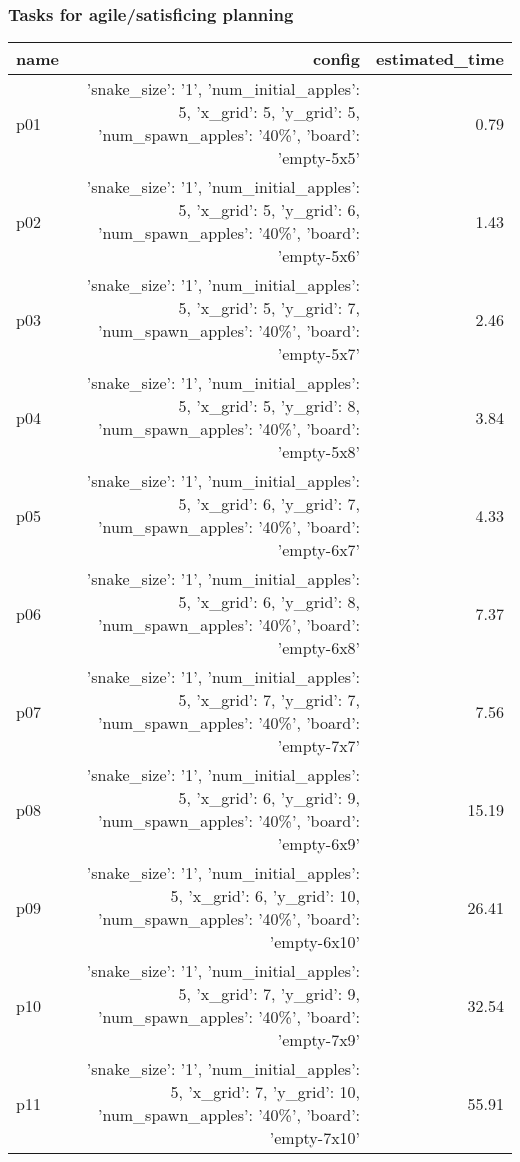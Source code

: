 \documentclass{article}
\begin{document}
                                \subsubsection*{Tasks for agile/satisficing planning}
                                
                            \begin{center}
                            \scriptsize
                            \begin{tabular}{@{}l|r|r@{}}
                            name & config & estimated\_time\\\midrule
                              p01&{'snake\_size': '1', 'num\_initial\_apples': 5, 'x\_grid': 5, 'y\_grid': 5, 'num\_spawn\_apples': '40\%', 'board': 'empty-5x5'}&0.79\\
  p02&{'snake\_size': '1', 'num\_initial\_apples': 5, 'x\_grid': 5, 'y\_grid': 6, 'num\_spawn\_apples': '40\%', 'board': 'empty-5x6'}&1.43\\
  p03&{'snake\_size': '1', 'num\_initial\_apples': 5, 'x\_grid': 5, 'y\_grid': 7, 'num\_spawn\_apples': '40\%', 'board': 'empty-5x7'}&2.46\\
  p04&{'snake\_size': '1', 'num\_initial\_apples': 5, 'x\_grid': 5, 'y\_grid': 8, 'num\_spawn\_apples': '40\%', 'board': 'empty-5x8'}&3.84\\
  p05&{'snake\_size': '1', 'num\_initial\_apples': 5, 'x\_grid': 6, 'y\_grid': 7, 'num\_spawn\_apples': '40\%', 'board': 'empty-6x7'}&4.33\\
  p06&{'snake\_size': '1', 'num\_initial\_apples': 5, 'x\_grid': 6, 'y\_grid': 8, 'num\_spawn\_apples': '40\%', 'board': 'empty-6x8'}&7.37\\
  p07&{'snake\_size': '1', 'num\_initial\_apples': 5, 'x\_grid': 7, 'y\_grid': 7, 'num\_spawn\_apples': '40\%', 'board': 'empty-7x7'}&7.56\\
  p08&{'snake\_size': '1', 'num\_initial\_apples': 5, 'x\_grid': 6, 'y\_grid': 9, 'num\_spawn\_apples': '40\%', 'board': 'empty-6x9'}&15.19\\
  p09&{'snake\_size': '1', 'num\_initial\_apples': 5, 'x\_grid': 6, 'y\_grid': 10, 'num\_spawn\_apples': '40\%', 'board': 'empty-6x10'}&26.41\\
  p10&{'snake\_size': '1', 'num\_initial\_apples': 5, 'x\_grid': 7, 'y\_grid': 9, 'num\_spawn\_apples': '40\%', 'board': 'empty-7x9'}&32.54\\
  p11&{'snake\_size': '1', 'num\_initial\_apples': 5, 'x\_grid': 7, 'y\_grid': 10, 'num\_spawn\_apples': '40\%', 'board': 'empty-7x10'}&55.91\\

\end{tabular}
\end{center}
\end{document}
